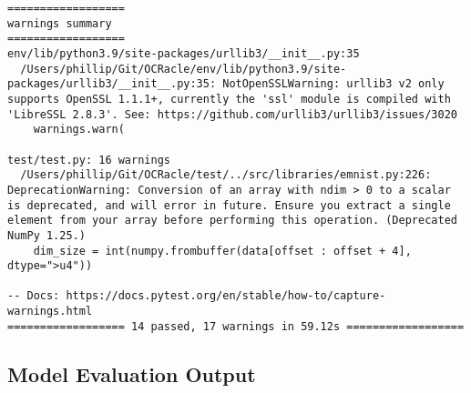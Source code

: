 \documentclass[12pt, titlepage]{article}
\begin{document}
\begin{verbatim}
==================
warnings summary
==================
env/lib/python3.9/site-packages/urllib3/__init__.py:35
  /Users/phillip/Git/OCRacle/env/lib/python3.9/site-packages/urllib3/__init__.py:35: NotOpenSSLWarning: urllib3 v2 only supports OpenSSL 1.1.1+, currently the 'ssl' module is compiled with 'LibreSSL 2.8.3'. See: https://github.com/urllib3/urllib3/issues/3020
    warnings.warn(

test/test.py: 16 warnings
  /Users/phillip/Git/OCRacle/test/../src/libraries/emnist.py:226: DeprecationWarning: Conversion of an array with ndim > 0 to a scalar is deprecated, and will error in future. Ensure you extract a single element from your array before performing this operation. (Deprecated NumPy 1.25.)
    dim_size = int(numpy.frombuffer(data[offset : offset + 4], dtype=">u4"))

-- Docs: https://docs.pytest.org/en/stable/how-to/capture-warnings.html
================== 14 passed, 17 warnings in 59.12s ==================
\end{verbatim}

\subsection{Model Evaluation Output}
\label{sec:model-eval-output}
\end{document}
